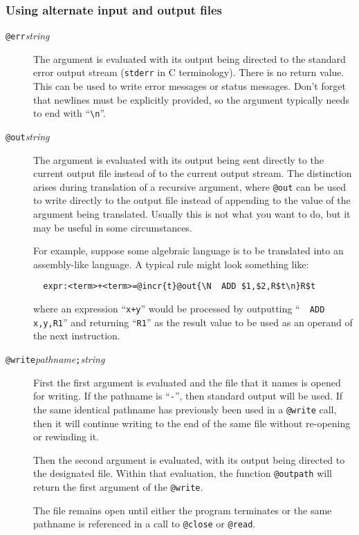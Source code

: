 \subsubsection{Using alternate input and output files}
\begin{description}

\item[{\tt @err\ttlb}{\it string}{\tt \ttrb}]
The argument is evaluated with its output being directed to the standard
error output stream (\verb/stderr/ in C terminology).
There is no return value.
This can be used to write error messages or status messages.
Don't forget that newlines must be explicitly provided, so the argument
typically needs to end with ``\verb/\n/''.

\item[{\tt @out\ttlb}{\it string}{\tt \ttrb}]
The argument is evaluated with its output being sent directly to the
current output file instead of to the current output stream.
The distinction arises during translation of a recursive argument, where
\verb/@out/ can be used to write directly to the output file instead of
appending to the value of the argument being translated.  Usually this
is not what you want to do, but it may be useful in some circumstances.

For example, suppose some algebraic language is to be translated into
an assembly-like language.  A typical rule might look something like:
\begin{verbatim}
  expr:<term>+<term>=@incr{t}@out{\N  ADD $1,$2,R$t\n}R$t
\end{verbatim}
where an expression ``\verb/x+y/'' would be processed by outputting
``\verb/  ADD x,y,R1/'' and returning ``\verb/R1/'' as the result value
to be used as an operand of the next instruction.

\item[{\tt @write\ttlb}{\it pathname}{\tt ;}{\it string}{\tt \ttrb}]
First the first argument is evaluated and the file that it names is
opened for writing.  If the pathname is ``\verb/-/'', then standard
output will be used.  If the same identical pathname has previously been
used in a \verb/@write/ call, then it will continue writing to the end
of the same file without re-opening or rewinding it.

Then the second argument is evaluated, with its output being directed to
the designated file.  Within that evaluation, the function
\verb/@outpath/ will return the first argument of the \verb/@write/.

The file remains open until either the program terminates or the same
pathname is referenced in a call to \verb/@close/ or \verb/@read/.


\end{description}
